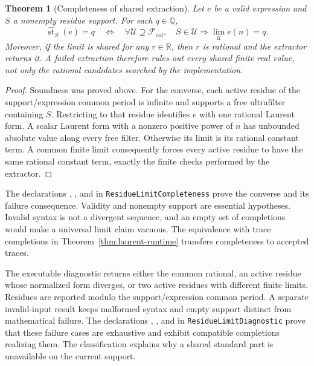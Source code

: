 \documentclass[11pt,a4paper]{article}
\theoremstyle{result}
\newtheorem{theorem}{Theorem}
\theoremstyle{definition}
\newcommand{\R}{\mathbb{R}}
\newcommand{\Q}{\mathbb{Q}}
\newcommand{\PUF}{\mathcal{U}}
\newcommand{\st}{\operatorname{st}}
\newcommand{\sthat}{\widehat{\st}}
\newcommand{\code}[1]{\texttt{#1}}
\begin{document}
\begin{theorem}[Completeness of shared extraction]\label{thm:extraction-completeness}
  Let $e$ be a valid expression and $S$ a nonempty residue support. For each $q\in\Q$,
  \[
    \sthat_S(e)=q
    \quad\Longleftrightarrow\quad
    \forall\PUF\supseteq\mathcal F_{\mathrm{cof}},\quad
      S\in\PUF\Longrightarrow\lim_{\PUF}e(n)=q.
  \]
  Moreover, if the limit is shared for any $r\in\R$, then $r$ is rational and the extractor returns it. A failed extraction therefore rules out every shared finite real value, not only the rational candidates searched by the implementation.
\end{theorem}
\begin{proof}
  Soundness was proved above. For the converse, each active residue of the support/expression common period is infinite and supports a free ultrafilter containing $S$. Restricting to that residue identifies $e$ with one rational Laurent form. A scalar Laurent form with a nonzero positive power of $n$ has unbounded absolute value along every free filter. Otherwise its limit is its rational constant term. A common finite limit consequently forces every active residue to have the same rational constant term, exactly the finite checks performed by the extractor.
\end{proof}

The declarations , , and  in \code{ResidueLimitCompleteness} prove the converse and its failure consequence. Validity and nonempty support are essential hypotheses. Invalid syntax is not a divergent sequence, and an empty set of completions would make a universal limit claim vacuous. The equivalence with trace completions in Theorem~\ref{thm:laurent-runtime} transfers completeness to accepted traces.

The executable diagnostic returns either the common rational, an active residue whose normalized form diverges, or two active residues with different finite limits. Residues are reported modulo the support/expression common period. A separate invalid-input result keeps malformed syntax and empty support distinct from mathematical failure. The declarations , , and  in \code{ResidueLimitDiagnostic} prove that these failure cases are exhaustive and exhibit compatible completions realizing them. The classification explains why a shared standard part is unavailable on the current support.
\end{document}

